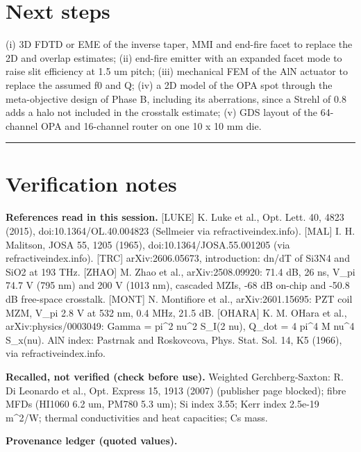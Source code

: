 \hypertarget{9-next-steps}{%
\section{Next steps}\label{findings-9-next-steps}}

(i) 3D FDTD or EME of the inverse taper, MMI and end-fire facet to
replace the 2D and overlap estimates; (ii) end-fire emitter with an
expanded facet mode to raise slit efficiency at 1.5 um pitch; (iii)
mechanical FEM of the AlN actuator to replace the assumed f0 and Q; (iv)
a 2D model of the OPA spot through the meta-objective design of Phase B,
including its aberrations, since a Strehl of 0.8 adds a halo not
included in the crosstalk estimate; (v) GDS layout of the 64-channel OPA
and 16-channel router on one 10 x 10 mm die.

\begin{center}\rule{0.5\linewidth}{0.5pt}\end{center}

\hypertarget{verification-notes}{%
\section{Verification notes}\label{findings-verification-notes}}

\textbf{References read in this session.} {[}LUKE{]} K. Luke et al.,
Opt. Lett. 40, 4823 (2015), doi:10.1364/OL.40.004823 (Sellmeier via
refractiveindex.info). {[}MAL{]} I. H. Malitson, JOSA 55, 1205 (1965),
doi:10.1364/JOSA.55.001205 (via refractiveindex.info). {[}TRC{]}
arXiv:2606.05673, introduction: dn/dT of Si3N4 and SiO2 at 193 THz.
{[}ZHAO{]} M. Zhao et al., arXiv:2508.09920: 71.4 dB, 26 ns, V\_pi 74.7
V (795 nm) and 200 V (1013 nm), cascaded MZIs, -68 dB on-chip and -50.8
dB free-space crosstalk. {[}MONT{]} N. Montifiore et al.,
arXiv:2601.15695: PZT coil MZM, V\_pi 2.8 V at 532 nm, 0.4 MHz, 21.5 dB.
{[}OHARA{]} K. M. O\textquotesingle Hara et al., arXiv:physics/0003049:
Gamma = pi\^{}2 nu\^{}2 S\_I(2 nu), Q\_dot = 4 pi\^{}4 M nu\^{}4
S\_x(nu). AlN index: Pastrnak and Roskovcova, Phys. Stat. Sol. 14, K5
(1966), via refractiveindex.info.

\textbf{Recalled, not verified (check before use).} Weighted
Gerchberg-Saxton: R. Di Leonardo et al., Opt. Express 15, 1913 (2007)
(publisher page blocked); fibre MFDs (HI1060 6.2 um, PM780 5.3 um); Si
index 3.55; Kerr index 2.5e-19 m\^{}2/W; thermal conductivities and heat
capacities; Cs mass.

\textbf{Provenance ledger (quoted values).}

